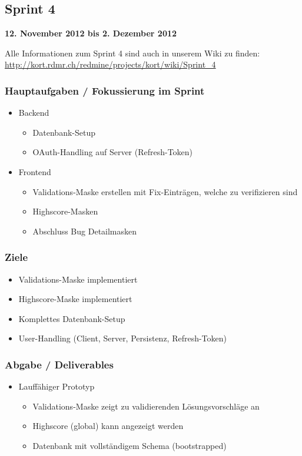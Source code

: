 \subsection{Sprint 4}

\textbf{12. November 2012 bis 2. Dezember 2012}

Alle Informationen zum Sprint 4 sind auch in unserem Wiki zu finden:
\url{http://kort.rdmr.ch/redmine/projects/kort/wiki/Sprint_4}

\subsubsection{Hauptaufgaben / Fokussierung im Sprint}

\begin{itemize}
	\item Backend
	\begin{itemize}
		\item Datenbank-Setup
		\item OAuth-Handling auf Server (Refresh-Token)
	\end{itemize}
	\item Frontend
	\begin{itemize}
		\item Validations-Maske erstellen mit Fix-Einträgen, welche zu verifizieren sind
		\item Highscore-Masken
		\item Abschluss Bug Detailmasken
	\end{itemize}
\end{itemize}

\subsubsection{Ziele}
\begin{itemize}
	\item Validations-Maske implementiert
	\item Highscore-Maske implementiert
	\item Komplettes Datenbank-Setup
	\item User-Handling (Client, Server, Persistenz, Refresh-Token)
\end{itemize}

\subsubsection{Abgabe / Deliverables}

\begin{itemize}
	\item Lauffähiger Prototyp
	\begin{itemize}
		\item Validations-Maske zeigt zu validierenden Lösungsvorschläge an
		\item Highscore (global) kann angezeigt werden
		\item Datenbank mit vollständigem Schema (bootstrapped)
	\end{itemize}
\end{itemize}


